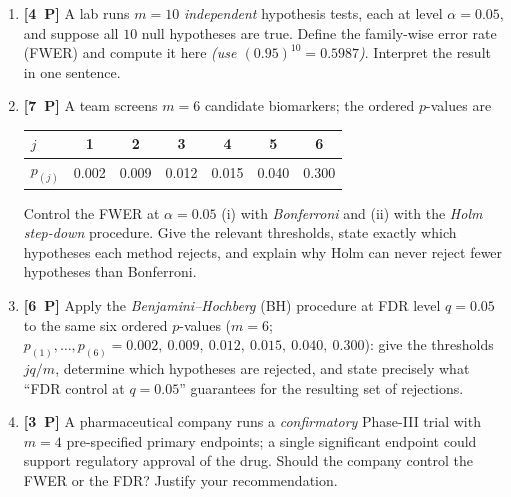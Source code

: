 \documentclass[11pt,a4paper]{article}
\newcommand{\pp}[1]{\textbf{[#1~P]}\enspace}
\begin{document}
\begin{enumerate}[label=(\alph*),leftmargin=7mm,itemsep=2.5mm]
  \item \pp{4} A lab runs $m=10$ \emph{independent} hypothesis tests, each at level
    $\alpha=0.05$, and suppose all $10$ null hypotheses are true. Define the family-wise error
    rate (FWER) and compute it here \emph{(use $(0.95)^{10}=0.5987$)}. Interpret the result in
    one sentence.
  \item \pp{7} A team screens $m=6$ candidate biomarkers; the ordered $p$-values are
    \begin{center}
    \begin{tabular}{lcccccc}
    \toprule
    $j$ & 1 & 2 & 3 & 4 & 5 & 6\\
    \midrule
    $p_{(j)}$ & 0.002 & 0.009 & 0.012 & 0.015 & 0.040 & 0.300\\
    \bottomrule
    \end{tabular}
    \end{center}
    Control the FWER at $\alpha=0.05$ (i) with \emph{Bonferroni} and (ii) with the
    \emph{Holm step-down} procedure. Give the relevant thresholds, state exactly which
    hypotheses each method rejects, and explain why Holm can never reject fewer hypotheses than
    Bonferroni.
  \item \pp{6} Apply the \emph{Benjamini--Hochberg} (BH) procedure at FDR level $q=0.05$ to the
    same six ordered $p$-values ($m=6$; $p_{(1)},\dots,p_{(6)}=0.002,\ 0.009,\ 0.012,\ 0.015,\
    0.040,\ 0.300$): give the thresholds $jq/m$, determine which hypotheses are rejected, and
    state precisely what ``FDR control at $q=0.05$'' guarantees for the resulting set of
    rejections.
  \item \pp{3} A pharmaceutical company runs a \emph{confirmatory} Phase-III trial with $m=4$
    pre-specified primary endpoints; a single significant endpoint could support regulatory
    approval of the drug. Should the company control the FWER or the FDR? Justify your
    recommendation.
\end{enumerate}
\end{document}
